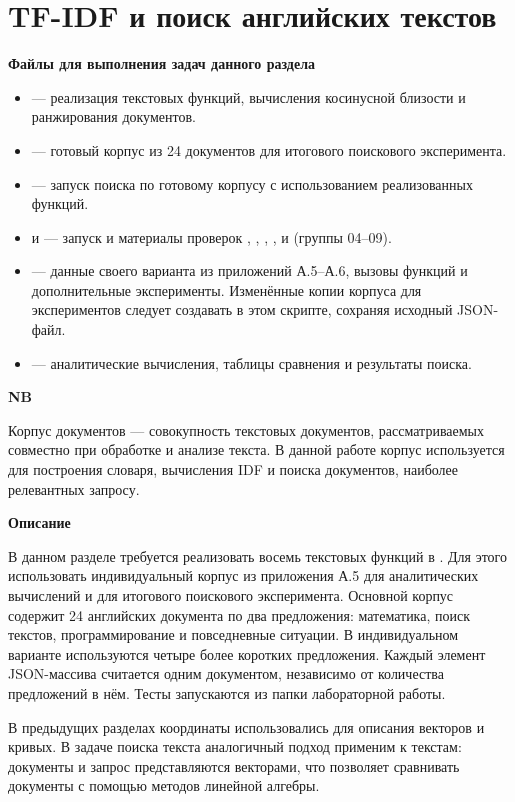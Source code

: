 \documentclass[12pt,a4paper]{article}
\newcommand{\taskhead}[1]{\par\textbf{#1}\par}
\newenvironment{notabene}
  {\par\medskip
   \begin{lrbox}{\nbbox}%
   \begin{minipage}{\dimexpr\linewidth-20pt\relax}
   {\fontsize{13}{16}\selectfont\bfseries
    \color{black!85}NB\par}
   \vspace{4pt}
   \noindent\ignorespaces}
  {\par\end{minipage}%
   \end{lrbox}%
   \noindent
   \begingroup
   \setlength{\fboxsep}{10pt}%
   \colorbox{blue!5}{\usebox{\nbbox}}%
   \endgroup
   \par\medskip}
\begin{document}
\section{TF-IDF и поиск английских текстов}
\taskhead{Файлы для выполнения задач данного раздела}
\begin{itemize}
\item {} --- реализация текстовых функций, вычисления косинусной близости и ранжирования документов.
\item {} --- готовый корпус из 24 документов для итогового поискового эксперимента.
\item {} --- запуск поиска по готовому корпусу с использованием реализованных функций.
\item {} и  --- запуск и материалы проверок , , , ,  и  (группы 04--09).
\item {} --- данные своего варианта из приложений А.5--А.6, вызовы функций и дополнительные эксперименты. Изменённые копии корпуса для экспериментов следует создавать в этом скрипте, сохраняя исходный JSON-файл.
\item {} --- аналитические вычисления, таблицы сравнения и результаты поиска.
\end{itemize}

\begin{notabene}
  Корпус документов — совокупность текстовых документов, рассматриваемых совместно при обработке и анализе текста. В данной работе корпус используется для построения словаря, вычисления IDF и поиска документов, наиболее релевантных запросу.
\end{notabene}

\taskhead{Описание}
В данном разделе требуется реализовать восемь текстовых функций в .
Для этого использовать индивидуальный корпус из приложения А.5 для аналитических
вычислений и  для итогового поискового эксперимента.
Основной корпус содержит 24 английских документа по два предложения: математика,
поиск текстов, программирование и повседневные ситуации. В индивидуальном варианте
используются четыре более коротких предложения. Каждый элемент JSON-массива
считается одним документом, независимо от количества предложений в нём.
Тесты запускаются из папки лабораторной работы.

{В предыдущих разделах координаты использовались для описания векторов и кривых. В задаче поиска текста аналогичный подход применим к текстам: 
документы и запрос представляются векторами, что позволяет сравнивать документы с помощью методов линейной алгебры.}
\end{document}
